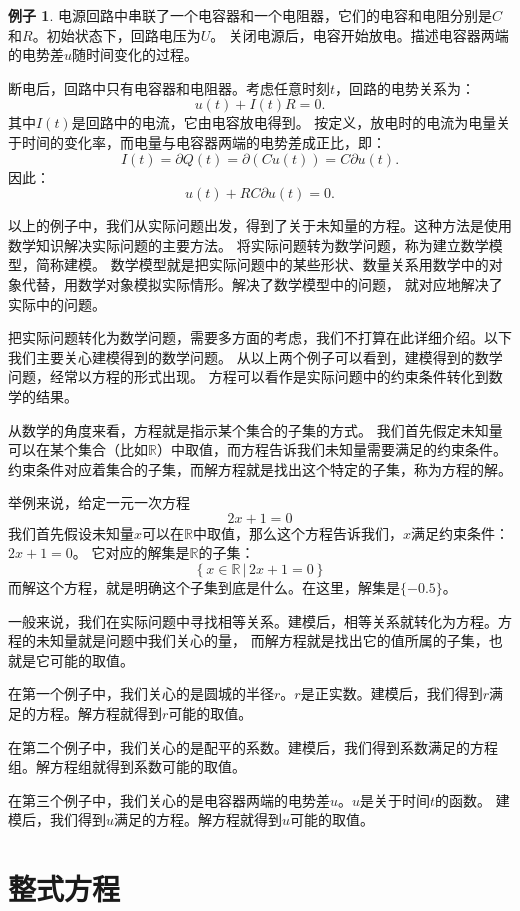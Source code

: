 \documentclass[12pt,UTF8]{ctexbook}
\theoremstyle{definition}
\newtheorem{ex}{例子}[section]
\theoremstyle{plain}
\begin{document}
\begin{ex}
    电源回路中串联了一个电容器和一个电阻器，它们的电容和电阻分别是$C$和$R$。初始状态下，回路电压为$U$。
    关闭电源后，电容开始放电。描述电容器两端的电势差$u$随时间变化的过程。
\end{ex}

断电后，回路中只有电容器和电阻器。考虑任意时刻$t$，回路的电势关系为：
$$ u(t) + I(t)R = 0.$$
其中$I(t)$是回路中的电流，它由电容放电得到。
按定义，放电时的电流为电量关于时间的变化率，而电量与电容器两端的电势差成正比，即：
$$ I(t) = \partial Q(t) = \partial (Cu(t)) = C\partial  u(t).$$
因此：
$$ u(t) + RC\partial  u(t) = 0.$$

以上的例子中，我们从实际问题出发，得到了关于未知量的方程。这种方法是使用数学知识解决实际问题的主要方法。
将实际问题转为数学问题，称为建立数学模型，简称建模。
数学模型就是把实际问题中的某些形状、数量关系用数学中的对象代替，用数学对象模拟实际情形。解决了数学模型中的问题，
就对应地解决了实际中的问题。

把实际问题转化为数学问题，需要多方面的考虑，我们不打算在此详细介绍。以下我们主要关心建模得到的数学问题。
从以上两个例子可以看到，建模得到的数学问题，经常以方程的形式出现。
方程可以看作是实际问题中的约束条件转化到数学的结果。

从数学的角度来看，方程就是指示某个集合的子集的方式。
我们首先假定未知量可以在某个集合（比如$\mathbb{R}$）中取值，而方程告诉我们未知量需要满足的约束条件。
约束条件对应着集合的子集，而解方程就是找出这个特定的子集，称为方程的解。

举例来说，给定一元一次方程
$$ 2x + 1 = 0$$
我们首先假设未知量$x$可以在$\mathbb{R}$中取值，那么这个方程告诉我们，$x$满足约束条件：$2x+1=0$。
它对应的解集是$\mathbb{R}$的子集：
$$ \left\{ x\in\mathbb{R} \, | \, 2x + 1 = 0 \right\} $$
而解这个方程，就是明确这个子集到底是什么。在这里，解集是$\{-0.5\}$。

一般来说，我们在实际问题中寻找相等关系。建模后，相等关系就转化为方程。方程的未知量就是问题中我们关心的量，
而解方程就是找出它的值所属的子集，也就是它可能的取值。

在第一个例子中，我们关心的是圆城的半径$r$。$r$是正实数。建模后，我们得到$r$满足的方程。解方程就得到$r$可能的取值。

在第二个例子中，我们关心的是配平的系数。建模后，我们得到系数满足的方程组。解方程组就得到系数可能的取值。

在第三个例子中，我们关心的是电容器两端的电势差$u$。$u$是关于时间$t$的函数。
建模后，我们得到$u$满足的方程。解方程就得到$u$可能的取值。

\section{整式方程}
\end{document}
